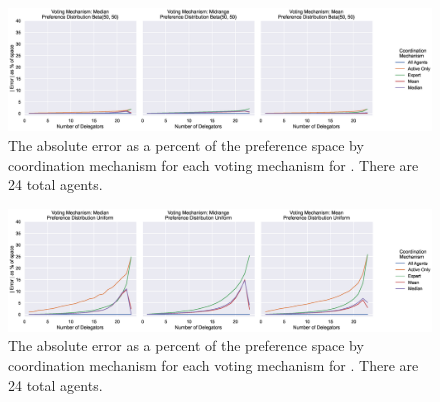 \label{apx:error-by-dist-zoomed}
\begin{landscape}
    \begin{figure}[p]
        \centering
        \includegraphics[scale=0.55]
        {content/chapter2/figures/distributions/Beta_50_50_error_as_percent_of_space_abs_mean}
        \caption{
            The absolute error as a percent of the preference space by coordination
            mechanism for each voting mechanism for .
            There are 24 total agents.
        }
        \label{fig:beta-50-50-error-as-percent-of-space-abs-mean}
    \end{figure}
\end{landscape}

\begin{landscape}
    \begin{figure}[p]
        \centering
        \includegraphics[scale=0.55]
        {content/chapter2/figures/distributions/Uniform_error_as_percent_of_space_abs_mean}
        \caption{
            The absolute error as a percent of the preference space by coordination
            mechanism for each voting mechanism for .
            There are 24 total agents.
        }
        \label{fig:uniform-error-as-percent-of-space-abs-mean}
    \end{figure}
\end{landscape}


